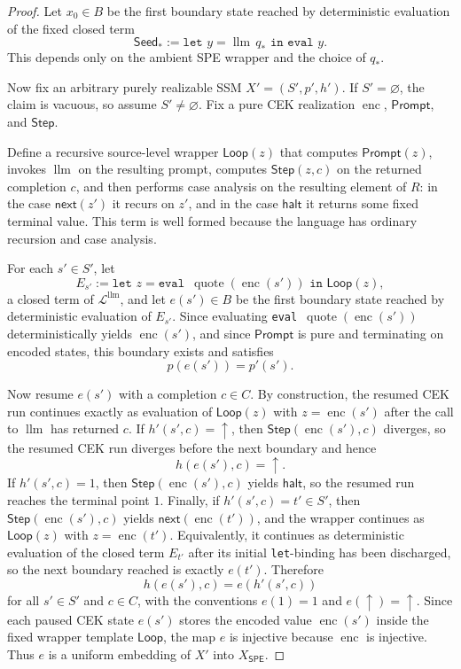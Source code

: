 \documentclass[11pt]{article}
\newcommand{\SPE}{\mathsf{SPE}}
\newcommand{\quoteop}{\operatorname{quote}}
\newcommand{\enc}{\operatorname{enc}}
\newcommand{\llm}{\operatorname{llm}}
\begin{document}
\begin{proof}
Let $x_0\in B$ be the first boundary state reached by deterministic evaluation of the fixed closed term
\[
\mathsf{Seed}_{\ast}:=\texttt{let } y = \llm\, q_{\ast} \texttt{ in eval } y.
\]
This depends only on the ambient SPE wrapper and the choice of $q_{\ast}$.

Now fix an arbitrary purely realizable SSM $X'=(S',p',h')$. If $S'=\varnothing$, the claim is vacuous, so assume $S'\neq\varnothing$. Fix a pure CEK realization $\enc$, $\mathsf{Prompt}$, and $\mathsf{Step}$.

Define a recursive source-level wrapper $\mathsf{Loop}(z)$ that computes $\mathsf{Prompt}(z)$, invokes $\llm$ on the resulting prompt, computes $\mathsf{Step}(z,c)$ on the returned completion $c$, and then performs case analysis on the resulting element of $R$: in the case $\mathsf{next}(z')$ it recurs on $z'$, and in the case $\mathsf{halt}$ it returns some fixed terminal value. This term is well formed because the language has ordinary recursion and case analysis.

For each $s'\in S'$, let
\[
E_{s'}:=\texttt{let } z = \texttt{eval }\,\quoteop(\enc(s')) \texttt{ in } \mathsf{Loop}(z),
\]
a closed term of $\mathcal{L}^{\llm}$, and let $e(s')\in B$ be the first boundary state reached by deterministic evaluation of $E_{s'}$. Since evaluating \texttt{eval} $\,\quoteop(\enc(s'))$ deterministically yields $\enc(s')$, and since $\mathsf{Prompt}$ is pure and terminating on encoded states, this boundary exists and satisfies
\[
p(e(s'))=p'(s').
\]

Now resume $e(s')$ with a completion $c\in C$. By construction, the resumed CEK run continues exactly as evaluation of $\mathsf{Loop}(z)$ with $z=\enc(s')$ after the call to $\llm$ has returned $c$. If $h'(s',c)=\uparrow$, then $\mathsf{Step}(\enc(s'),c)$ diverges, so the resumed CEK run diverges before the next boundary and hence
\[
h(e(s'),c)=\uparrow.
\]
If $h'(s',c)=1$, then $\mathsf{Step}(\enc(s'),c)$ yields $\mathsf{halt}$, so the resumed run reaches the terminal point $1$. Finally, if $h'(s',c)=t'\in S'$, then $\mathsf{Step}(\enc(s'),c)$ yields $\mathsf{next}(\enc(t'))$, and the wrapper continues as $\mathsf{Loop}(z)$ with $z=\enc(t')$. Equivalently, it continues as deterministic evaluation of the closed term $E_{t'}$ after its initial \texttt{let}-binding has been discharged, so the next boundary reached is exactly $e(t')$. Therefore
\[
h(e(s'),c)=e(h'(s',c))
\]
for all $s'\in S'$ and $c\in C$, with the conventions $e(1)=1$ and $e(\uparrow)=\uparrow$. Since each paused CEK state $e(s')$ stores the encoded value $\enc(s')$ inside the fixed wrapper template $\mathsf{Loop}$, the map $e$ is injective because $\enc$ is injective. Thus $e$ is a uniform embedding of $X'$ into $X_{\SPE}$.


\end{proof}
\end{document}
